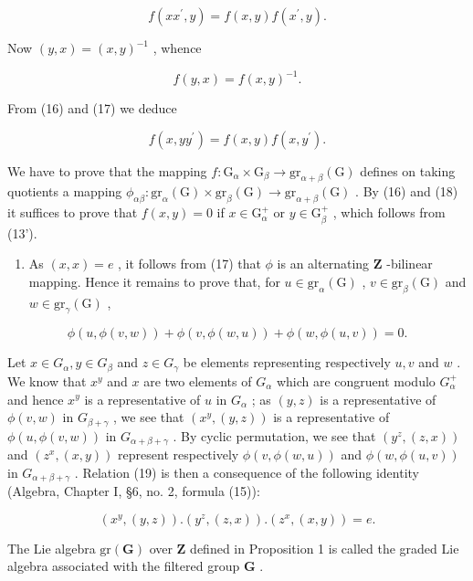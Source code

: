\[
f (x x ^ {\prime}, y) = f (x, y) f (x ^ {\prime}, y).\tag{16}
\]

Now \((y, x) = (x, y)^{-1}\) , whence

\[
f (y, x) = f (x, y) ^ {- 1}.\tag{17}
\]

From (16) and (17) we deduce

\[
f (x, y y ^ {\prime}) = f (x, y) f (x, y ^ {\prime}).\tag{18}
\]

We have to prove that the mapping \(f\colon \mathrm{G}_{\alpha}\times \mathrm{G}_{\beta}\to \mathrm{gr}_{\alpha +\beta}(\mathrm{G})\) defines on taking quotients a mapping \(\phi_{\alpha \beta}\colon \mathrm{gr}_{\alpha}(\mathrm{G})\times \mathrm{gr}_{\beta}(\mathrm{G})\to \mathrm{gr}_{\alpha +\beta}(\mathrm{G})\) . By (16) and (18) it suffices to prove that \(f(x,y) = 0\) if \(x\in \mathrm{G}_{\alpha}^{+}\) or \(y\in \mathrm{G}_{\beta}^{+}\) , which follows from (13').

\begin{enumerate}
\def\labelenumi{(\roman{enumi})}
\setcounter{enumi}{1}
\tightlist
\item
  As \((x, x) = e\) , it follows from (17) that \(\phi\) is an alternating \(\mathbf{Z}\) -bilinear mapping. Hence it remains to prove that, for \(u \in \mathrm{gr}_{\alpha}(\mathrm{G})\) , \(v \in \mathrm{gr}_{\beta}(\mathrm{G})\) and \(w \in \mathrm{gr}_{\gamma}(\mathrm{G})\) ,
\end{enumerate}

\[
\phi (u, \phi (v, w)) + \phi (v, \phi (w, u)) + \phi (w, \phi (u, v)) = 0.\tag{19}
\]

Let \(x \in G_{\alpha}, y \in G_{\beta}\) and \(z \in G_{\gamma}\) be elements representing respectively \(u, v\) and \(w\) . We know that \(x^{y}\) and \(x\) are two elements of \(G_{\alpha}\) which are congruent modulo \(G_{\alpha}^{+}\) and hence \(x^{y}\) is a representative of \(u\) in \(G_{\alpha}\) ; as \((y, z)\) is a representative of \(\phi(v, w)\) in \(G_{\beta + \gamma}\) , we see that \((x^{y}, (y, z))\) is a representative of \(\phi(u, \phi(v, w))\) in \(G_{\alpha + \beta + \gamma}\) . By cyclic permutation, we see that \((y^{z}, (z, x))\) and \((z^{x}, (x, y))\) represent respectively \(\phi(v, \phi(w, u))\) and \(\phi(w, \phi(u, v))\) in \(G_{\alpha + \beta + \gamma}\) . Relation (19) is then a consequence of the following identity (Algebra, Chapter I, §6, no. 2, formula (15)):

\[
\left(x ^ {y}, (y, z)\right). \left(y ^ {z}, (z, x)\right). \left(z ^ {x}, (x, y)\right) = e.\tag{20}
\]

The Lie algebra \(\mathrm{gr}(\mathbf{G})\) over \(\mathbf{Z}\) defined in Proposition 1 is called the graded Lie algebra associated with the filtered group \(\mathbf{G}\) .

